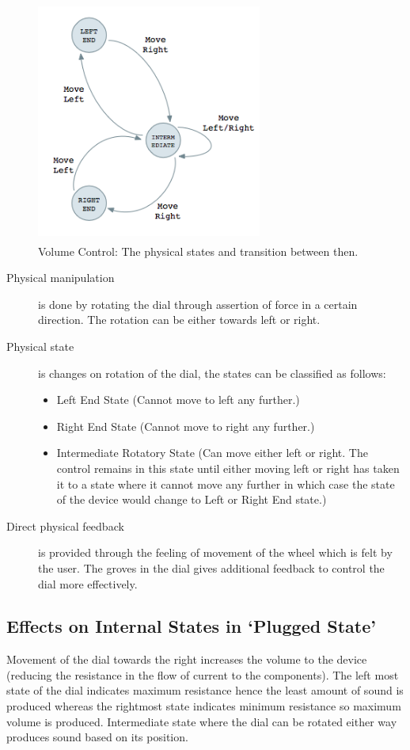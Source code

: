 \documentclass[10pt,a4paper]{article}
\begin{document}
\begin{figure}[hbpt]
\centerline{\includegraphics[width=280px,height=300px,keepaspectratio]{VC1}}
\caption {Volume Control: The physical states and transition between then.}
\label{physical_state_power_switch}
\end{figure}

\begin{description}
\item [Physical manipulation] is done by rotating the dial through assertion of force in a certain direction. The rotation can be either towards left or right.
\item [Physical state] is changes on rotation of the dial, the states can be classified as follows:
\begin{itemize}
\item Left End State (Cannot move to left any further.)
\item Right End State (Cannot move to right any further.)
\item Intermediate Rotatory State (Can move either left or right. The control remains in this state until either moving left or right has taken it to a state where it cannot move any further in which case the state of the device would change to Left or Right End state.)
\end{itemize}
\item [Direct physical feedback] is provided through the feeling of movement of the wheel which is felt by the user. The groves in the dial gives additional feedback to control the dial more effectively.
\end{description}

\subsection{Effects on Internal States in `Plugged State'}
Movement of the dial towards the right increases the volume to the device (reducing the resistance in the flow of current to the components). The left most state of the dial indicates maximum resistance hence the least amount of sound is produced whereas the rightmost state indicates minimum resistance so maximum volume is produced. Intermediate state where the dial can be rotated either way produces sound based on its position.
\end{document}
